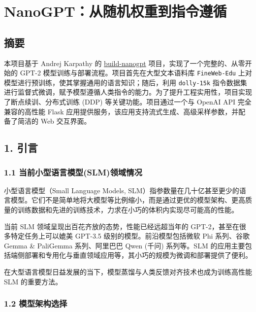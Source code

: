 \documentclass[a4paper]{article}
\author{}
\date{}
\begin{document}
\section{NanoGPT：从随机权重到指令遵循}\label{nanogptux4eceux968fux673aux6743ux91cdux5230ux6307ux4ee4ux9075ux5faa}

\subsection{摘要}\label{ux6458ux8981}

本项目基于 Andrej Karpathy 的
\href{https://github.com/karpathy/build-nanogpt}{build-nanogpt}
项目，实现了一个完整的、从零开始的 GPT-2
模型训练与部署流程。项目首先在大型文本语料库 \texttt{FineWeb-Edu}
上对模型进行预训练，使其掌握通用的语言知识；随后，利用
\texttt{dolly-15k}
指令数据集进行监督式微调，赋予模型遵循人类指令的能力。为了提升工程实用性，项目实现了断点续训、分布式训练
(DDP) 等关键功能。项目通过一个与 OpenAI API 完全兼容的高性能 Flask
应用提供服务，该应用支持流式生成、高级采样参数，并配备了简洁的 Web
交互界面。

\subsection{1. 引言}\label{ux5f15ux8a00}

\subsubsection{1.1
当前小型语言模型(SLM)领域情况}\label{ux5f53ux524dux5c0fux578bux8bedux8a00ux6a21ux578bslmux9886ux57dfux60c5ux51b5}

小型语言模型（Small Language Models,
SLM）指参数量在几十亿甚至更少的语言模型。它们不是简单地将大模型等比例缩小，而是通过更优的模型架构、更高质量的训练数据和先进的训练技术，力求在小巧的体积内实现尽可能高的性能。

当前 SLM 领域呈现出百花齐放的态势，性能已经远超当年的
GPT-2，甚至在很多特定任务上可以媲美 GPT-3.5 级别的模型。前沿模型包括微软
Phi 系列、谷歌 Gemma \& PaliGemma 系列、阿里巴巴 Qwen (千问) 系列等。SLM
的应用主要包括端侧部署和专用化与垂直领域应用等，其小巧的规模为微调和部署提供了便利。

在大型语言模型日益发展的当下，模型蒸馏与人类反馈对齐技术也成为训练高性能
SLM 的重要方法。

\subsubsection{1.2
模型架构选择}\label{ux6a21ux578bux67b6ux6784ux9009ux62e9}
\end{document}
